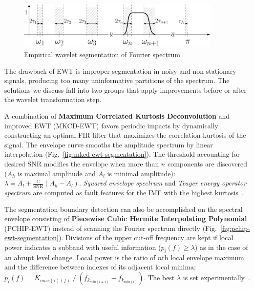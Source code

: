 \begin{figure}[ht]
    \centering
    \includegraphics[width=0.9\textwidth]{assets/analysis/EWT.png}
    \caption{Empirical wavelet segmentation of Fourier spectrum~\cite{gilles_empirical_2013}}
    \label{fig:ewt-spectrum-segmentation}
\end{figure}

The drawback of EWT is improper segmentation in noisy and non-stationary signals, producing too many uninformative partitions of the spectrum. The solutions we discuss fall into two groups that apply improvements before or after the wavelet transformation step. 

A combination of \textbf{Maximum Correlated Kurtosis Deconvolution} and improved EWT (MKCD-EWT) favors periodic impacts by dynamically constructing an optimal FIR filter that maximizes the correlation kurtosis of the signal. The envelope curve smooths the amplitude spectrum by linear interpolation (Fig.~\ref{fig:mkcd-ewt-segmentation}). The threshold accounting for desired SNR modifies the envelope when more than $n$ components are discovered ($A_h$ is maximal amplitude and $A_l$ is minimal amplitude): $\lambda = A_l + \frac{C}{\mathrm{SNR}}(A_h - A_l)$. \emph{Squared envelope spectrum} and \emph{Teager energy operator spectrum} are computed as fault features for the IMF with the highest kurtosis~\cite{li_fault_2019}. 

The segmentation boundary detection can also be accomplished on the spectral envelope consisting of \textbf{Piecewise Cubic Hermite Interpolating Polynomial} (PCHIP-EWT) instead of scanning the Fourier spectrum directly (Fig.~\ref{fig:pchip-ewt-segmentation}). Divisions of the upper cut-off frequency are kept if local power indicates a subband with useful information ($p_i(f) \geq \lambda$)  as in the case of an abrupt level change. Local power is the ratio of $n$th local envelope maximum and the difference between indexes of its adjacent local minima:  $p_i(f) = K_{max(i)(f)} \;/\;\left(f_{k_{min(i+1)}} - f_{k_{min(i)}}\right)$. The best $\lambda$ is set experimentally~\cite{zhuang_improved_2020}.

